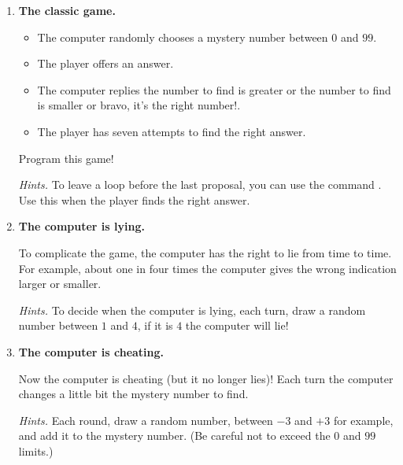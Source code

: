 \documentclass[11pt,class=report,crop=false]{standalone}
\begin{document}
\bigskip
\bigskip


\begin{activite}



\begin{enumerate}
  \item \textbf{The classic game.}
  \begin{itemize}
    \item The computer randomly chooses a mystery number between $0$ and $99$.
    \item The player offers an answer.
    \item The computer replies 
    \og{}the number to find is greater\fg{} or
     \og{}the number to find is smaller\fg{} or
      \og{}bravo, it's the right number!\fg{}. 
     \item The player has seven attempts to find the right answer.
  \end{itemize}
  
  Program this game!
  
  \emph{Hints.} To leave a loop  before the last proposal, you can use the command . Use this when the player finds the right answer.

  
  \item \textbf{The computer is lying.}
  
  To complicate the game, the computer has the right to lie from time to time.
  For example, about one in four times the computer gives the wrong indication \og{}larger\fg{}
  or \og{}smaller\fg{}.
  
  \emph{Hints.} To decide when the computer is lying, each turn, draw a random number between $1$ and $4$, if it is $4$ the computer will lie!
  
  
  
  
  \item \textbf{The computer is cheating.}
  
  Now the computer is cheating (but it no longer lies)! Each turn the computer changes a little bit the mystery number to find.
  
    \emph{Hints.} Each round, draw a random number, between $-3$ and $+3$ for example, and add it to the mystery number. (Be careful not to exceed the $0$ and $99$ limits.)
  
\end{enumerate}   
     
\end{activite}
\end{document}
